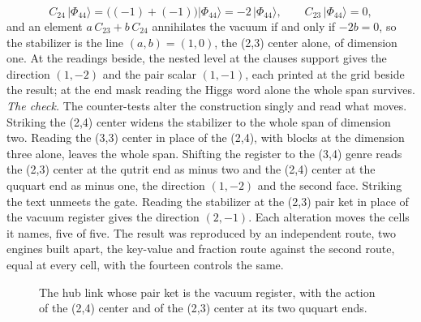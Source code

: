 \begin{chproof}
\begin{equation} C_{24}\,\lvert\Phi_{44}\rangle = \big((-1) + (-1)\big)\lvert\Phi_{44}\rangle = -2\,\lvert\Phi_{44}\rangle, \qquad C_{23}\,\lvert\Phi_{44}\rangle = 0 , \end{equation}
and an element $a\,C_{23} + b\,C_{24}$ annihilates the vacuum if and only if $-2b = 0$, so the stabilizer is the line $(a, b) = (1, 0)$, the (2,3) center alone, of dimension one. At the readings beside, the nested level at the clauses support gives the direction $(1,-2)$ and the pair scalar $(1,-1)$, each printed at the grid beside the result; at the end mask reading the Higgs word alone the whole span survives.
\textit{The check.} The counter-tests alter the construction singly and read what moves. Striking the (2,4) center widens the stabilizer to the whole span of dimension two. Reading the (3,3) center in place of the (2,4), with blocks at the dimension three alone, leaves the whole span. Shifting the register to the (3,4) genre reads the (2,3) center at the qutrit end as minus two and the (2,4) center at the ququart end as minus one, the direction $(1,-2)$ and the second face. Striking the text unmeets the gate. Reading the stabilizer at the (2,3) pair ket in place of the vacuum register gives the direction $(2,-1)$. Each alteration moves the cells it names, five of five. The result was reproduced by an independent route, two engines built apart, the key-value and fraction route against the second route, equal at every cell, with the fourteen controls the same.
\begin{figure}[h]\centering{}\caption{The hub link whose pair ket is the vacuum register, with the action of the (2,4) center and of the (2,3) center at its two ququart ends.}\end{figure}
\end{chproof}

